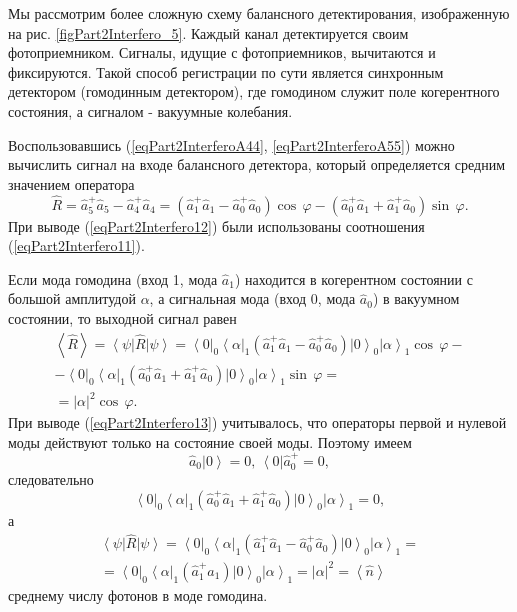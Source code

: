 

Мы рассмотрим более сложную схему балансного детектирования,
изображенную на рис. \ref{figPart2Interfero_5}. Каждый канал
детектируется своим фотоприемником. Сигналы, идущие с фотоприемников, 
вычитаются и фиксируются. Такой способ регистрации по сути является
синхронным детектором (гомодинным детектором), где гомодином служит
поле когерентного состояния, а сигналом - вакуумные колебания.

Воспользовавшись (\ref{eqPart2InterferoA44},
\ref{eqPart2InterferoA55}) можно вычислить
сигнал на входе балансного детектора, который определяется средним значением
оператора  
\begin{equation}
\hat{R} = 
\hat{a}_5^{+} \hat{a}_5 - 
\hat{a}_4^{+} \hat{a}_4 =
\left(
\hat{a}_1^{+} \hat{a}_1 - 
\hat{a}_0^{+} \hat{a}_0
\right) \cos\,\varphi -
\left(
\hat{a}_0^{+} \hat{a}_1 + 
\hat{a}_1^{+} \hat{a}_0
\right) \sin\,\varphi.
\label{eqPart2Interfero12}
\end{equation}
При выводе (\ref{eqPart2Interfero12}) были использованы соотношения
(\ref{eqPart2Interfero11}).

Если мода гомодина (вход 1, мода $\hat{a}_1$) находится в
когерентном состоянии с большой амплитудой $\alpha$, а сигнальная мода
(вход 0, мода $\hat{a}_0$) в вакуумном состоянии, то выходной сигнал
равен
\begin{eqnarray}
\left<\hat{R}\right> = 
\left<\psi\right|\hat{R} \left|\psi\right> = 
\left<0\right|_0\left<\alpha\right|_1
\left(
\hat{a}_1^{+} \hat{a}_1 - 
\hat{a}_0^{+} \hat{a}_0
\right)
\left|0\right>_0\left|\alpha\right>_1
\cos\,\varphi
-
\nonumber \\
-
\left<0\right|_0\left<\alpha\right|_1
\left(
\hat{a}_0^{+} \hat{a}_1 + 
\hat{a}_1^{+} \hat{a}_0
\right) 
\left|0\right>_0\left|\alpha\right>_1
\sin\,\varphi = 
\nonumber \\
= \left|\alpha\right|^2 \cos\,\varphi.
\label{eqPart2Interfero13}
\end{eqnarray}
При выводе (\ref{eqPart2Interfero13}) учитывалось, что операторы
первой и нулевой моды действуют только на состояние своей
моды. Поэтому имеем
\[
\hat{a}_0\left|0\right> = 0, \, 
\left<0\right|\hat{a}_0^{+} = 0,
\]
следовательно 
\[
\left<0\right|_0\left<\alpha\right|_1
\left(
\hat{a}_0^{+} \hat{a}_1 + 
\hat{a}_1^{+} \hat{a}_0
\right) 
\left|0\right>_0\left|\alpha\right>_1 = 0,
\]
а
\begin{eqnarray}
\left<\psi\right|\hat{R} \left|\psi\right>= 
\left<0\right|_0\left<\alpha\right|_1
\left(
\hat{a}_1^{+} \hat{a}_1 - 
\hat{a}_0^{+} \hat{a}_0
\right)
\left|0\right>_0\left|\alpha\right>_1
=
\nonumber \\
=
\left<0\right|_0\left<\alpha\right|_1
\left(
\hat{a}_1^{+} \hat{a}_1
\right)
\left|0\right>_0\left|\alpha\right>_1
= \left|\alpha\right|^2 = 
\left<\hat{n}\right>
\nonumber
\end{eqnarray}
среднему числу фотонов в моде гомодина.

